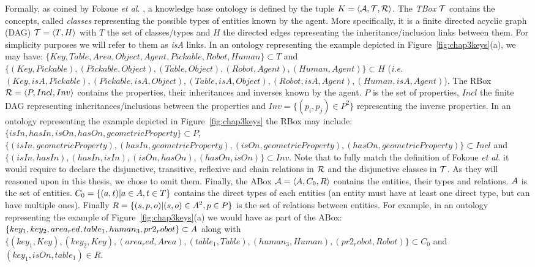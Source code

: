 \documentclass[a4paper,11pt,twoside]{StyleThese}
\begin{document}
Formally, as coined by Fokoue \textit{et al.} \cite{fokoue2006summary}, a knowledge base ontology is defined by the tuple $K = \langle \mathcal{A}, \mathcal{T}, \mathcal{R} \rangle$. 
The \textit{TBox} $\mathcal{T}$ contains the concepts, called \textit{classes} representing the possible types of entities known by the agent. More specifically, it is a finite directed acyclic graph (DAG) $\mathcal{T} = \langle T, H \rangle$ with $T$ the set of classes/types and $H$ the directed edges representing the inheritance/inclusion links between them. For simplicity purposes we will refer to them as \textit{isA} links. In an ontology representing the example depicted in Figure~\ref{fig:chap3keys}(a), we may have: $\{Key, Table, Area, Object, Agent, Pickable, Robot, Human\} \subset T$ and $\{(Key, Pickable), (Pickable, Object), (Table, Object), (Robot, Agent), (Human, Agent)\} \subset H$ (\textit{i.e.} $(Key, isA, Pickable), (Pickable, isA, Object), (Table, isA, Object), (Robot, isA, Agent), (Human, isA, Agent)$). 
The RBox $\mathcal{R} = \langle P, Incl, Inv \rangle$ contains the properties, their inheritances and inverses known by the agent. $P$ is the set of properties, $Incl$ the finite DAG representing inheritances/inclusions between the properties and $Inv = \{(p_i, p_j) \in P^2\}$ representing the inverse properties. In an ontology representing the example depicted in Figure~\ref{fig:chap3keys} the RBox may include: $\{isIn, hasIn, isOn, hasOn, geometricProperty\} \subset P$, $\{(isIn, geometricProperty), (hasIn, geometricProperty), (isOn, geometricProperty), (hasOn, geometricProperty)\} \subset Incl$ and $\{(isIn, hasIn), (hasIn, isIn), (isOn, hasOn), (hasOn, isOn)\} \subset Inv$. Note that to fully match the definition of Fokoue \textit{et al.} \cite{fokoue2006summary} it would require to declare the disjunctive, transitive, reflexive and chain relations in $\mathcal{R}$ and the disjunctive classes in $\mathcal{T}$. As they will reasoned upon in this thesis, we chose to omit them.
Finally, the ABox $\mathcal{A} = \langle A, C_0, R \rangle$ contains the entities, their types and relations. $A$ is the set of entities. $C_0 = \{(a, t)|a \in A, t \in T\}$ contains the direct types of each entities (an entity must have at least one direct type, but can have multiple ones). Finally $R = \{(s, p, o)|(s, o) \in A^2, p \in P\}$ is the set of relations between entities. For example, in an ontology representing the example of Figure~\ref{fig:chap3keys}(a) we would have as part of the ABox: $\{key_1, key_2, area_red, table_1, human_3, pr2_robot\} \subset A$ along with $\{(key_1, Key), (key_2, Key), (area_red, Area), (table_1, Table), (human_3, Human), (pr2_robot, Robot)\} \subset C_0$ and $(key_1, isOn, table_1) \in R$.
\end{document}

